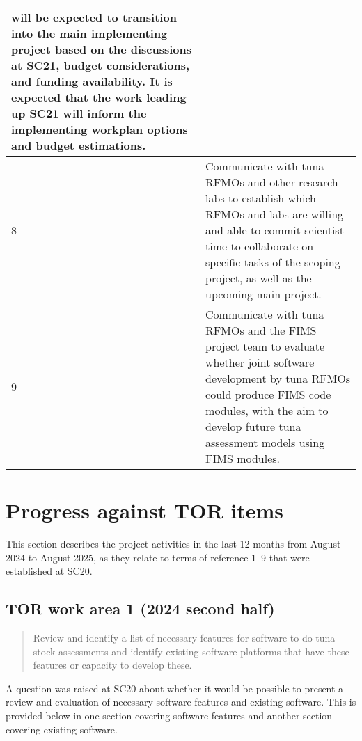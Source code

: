 \documentclass{SCreport}
\begin{document}
\begin{table}
\begin{tabular}{p{1cm}p{13cm}}
        will be expected to transition into the main implementing project based
        on the discussions at SC21, budget considerations, and funding
        availability. It is expected that the work leading up SC21 will inform
        the implementing workplan options and budget estimations.\\
    \hline
    8 & Communicate with tuna RFMOs and other research labs to establish which
        RFMOs and labs are willing and able to commit scientist time to
        collaborate on specific tasks of the scoping project, as well as the
        upcoming main project.\\
    \hline
    9 & Communicate with tuna RFMOs and the FIMS project team to evaluate
        whether joint software development by tuna RFMOs could produce FIMS code
        modules, with the aim to develop future tuna assessment models using
        FIMS modules.\\
    \hline
  \end{tabular}
\end{table}

\clearpage

\section{Progress against TOR items}

This section describes the project activities in the last 12 months from August
2024 to August 2025, as they relate to terms of reference 1--9 that were
established at SC20.

\vspace{1ex}

\subsection{TOR work area 1 (2024 second half)}

\begin{quote}\sf
  Review and identify a list of necessary features for software to do tuna stock
  assessments and identify existing software platforms that have these features
  or capacity to develop these.
\end{quote}

\vspace{2ex}

A question was raised at SC20 about whether it would be possible to present a
review and evaluation of necessary software features and existing software. This
is provided below in one section covering software features and another section
covering existing software.
\end{document}
